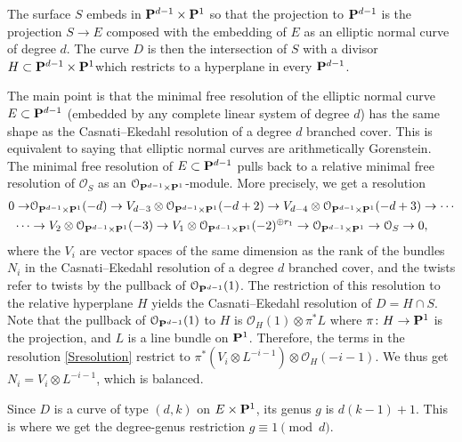\documentclass{amsart}
\renewcommand{\O}{{\mathcal O}}
\renewcommand {\P}{{\bf P}}
\providecommand {\from}{{\colon}}
\numberwithin{equation}{section}
\begin{document}
The surface $S$ embeds in $\P^{d-1} \times \P^{1}$ so that the projection to $\P^{d-1}$ is the projection $S \to E$ composed with the embedding of $E$ as an elliptic normal curve of degree $d$. The curve $D$ is then the intersection of $S$ with a divisor $H \subset \P^{d-1} \times \P^{1}$which restricts to a hyperplane in every $\P^{d-1}$.  

The main point is that the minimal free resolution of the elliptic normal curve $E \subset \P^{d-1}$ (embedded by any complete linear system of degree $d$) has the same shape as the Casnati--Ekedahl resolution of a degree $d$ branched cover.
This is equivalent to saying that elliptic normal curves are arithmetically Gorenstein.
The minimal free resolution of $E \subset \P^{d-1}$ pulls back to a relative minimal free resolution of $\O_{S}$ as an $\O_{\P^{d-1} \times \P^{1}}$-module.
More precisely, we get a resolution 
  \begin{equation}\label{Sresolution}
    \begin{split}
      0 \to &\O_{\P^{d-1} \times \P^{1}}(-d) \to V_{d-3} \otimes \O_{\P^{d-1} \times
        \P^{1}}(-d+2) \to V_{d-4} \otimes \O_{\P^{d-1} \times
        \P^{1}}(-d+3) \to \cdots \\
      \cdots &\to 
      V_2 \otimes \O_{\P^{d-1} \times
        \P^{1}}(-3) \to 
      V_1 \otimes \O_{\P^{d-1} \times
        \P^{1}}(-2)^{\oplus r_{1}} \to \O_{\P^{d-1} \times \P^{1}} \to
      \O_{S} \to 0,
    \end{split}
  \end{equation}
  where the $V_{i}$ are vector spaces of the same dimension as the rank of the bundles $N_i$ in the Casnati--Ekedahl resolution of a degree $d$ branched cover, and the twists refer to twists by the pullback of $\O_{\P^{d-1}}(1)$. 
  The restriction of this resolution to the relative hyperplane $H$ yields the Casnati--Ekedahl resolution of $D = H \cap S$.
  Note that the pullback of $\O_{\P^{d-1}}(1)$ to $H$ is $\O_H(1) \otimes \pi^* L$ where $\pi \from H \to \P^1$ is the projection, and $L$ is a line bundle on $\P^1$.
  Therefore, the terms in the resolution \eqref{Sresolution} restrict to $\pi^* (V_i \otimes L^{-i-1}) \otimes \O_H(-i-1)$.
  We thus get $N_i = V_i \otimes L^{-i-1}$, which is balanced.

  Since $D$ is a curve of type $(d,k)$ on $E \times \P^{1}$, its genus $g$ is $d(k-1)+1$.
  This is where we get the degree-genus restriction $g \equiv 1 \pmod d$.
\end{document}
